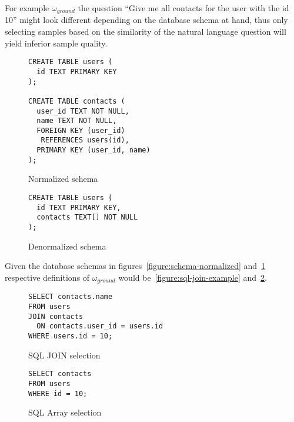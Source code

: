 For example $\omega_{ground}$ the question ``Give me all contacts for the user with the id 10''
might look different depending on the database schema at hand, thus only selecting
samples based on the similarity of the natural language question will yield inferior
sample quality.

\begin{figure}[ht]
  \vspace{1em}
  \hfill
  \begin{minipage}[b]{0.45\linewidth}
    \begin{verbatim}
CREATE TABLE users (
  id TEXT PRIMARY KEY
);

CREATE TABLE contacts (
  user_id TEXT NOT NULL,
  name TEXT NOT NULL,
  FOREIGN KEY (user_id) 
   REFERENCES users(id),
  PRIMARY KEY (user_id, name)
);
    \end{verbatim}
    \caption{Normalized schema}
    \label{figure:schema-normalized}
  \end{minipage}
  \hfill
  \begin{minipage}[b]{0.35\linewidth}
    \begin{verbatim}
CREATE TABLE users (
  id TEXT PRIMARY KEY,
  contacts TEXT[] NOT NULL
);
    \end{verbatim}
    \vspace{3.75em}
    \caption{Denormalized schema}
    \label{figure:schema-denormalized}
  \end{minipage}
  \hfill
  \vspace{1em}
\end{figure}

Given the database schemas in figures~\ref{figure:schema-normalized} and~\ref{figure:schema-denormalized}
respective definitions of $\omega_{ground}$ would be~\ref{figure:sql-join-example}
and~\ref{figure:sql-array-example}.

\begin{figure}[ht]
  \vspace{1em}
  \hfill
  \begin{minipage}[b]{0.45\linewidth}
    \begin{verbatim}
SELECT contacts.name
FROM users
JOIN contacts
  ON contacts.user_id = users.id
WHERE users.id = 10;
    \end{verbatim}
    \caption{SQL JOIN selection}
    \label{figure:sql-join-example}
  \end{minipage}
  \hfill
  \begin{minipage}[b]{0.35\linewidth}
    \centering
    \begin{verbatim}
SELECT contacts
FROM users
WHERE id = 10;
    \end{verbatim}
    \vspace{1.3em}
    \caption{SQL Array selection}
    \label{figure:sql-array-example}
  \end{minipage}
  \hfill
  \vspace{1em}
\end{figure}


